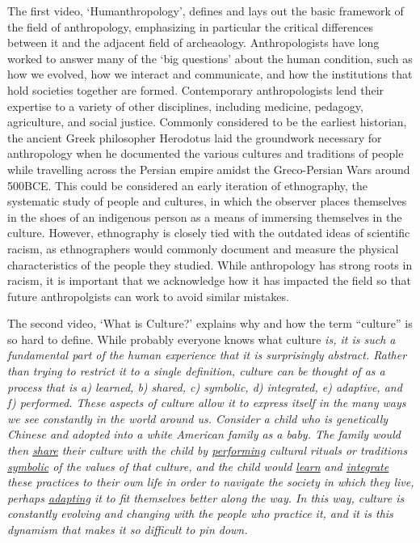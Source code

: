 \documentclass{article}
\begin{document}
The first video, `Humanthropology', defines and lays out the basic framework of the field of anthropology, emphasizing in particular the critical differences between it and the adjacent field of archeaology.
Anthropologists have long worked to answer many of the `big questions' about the human condition, such as how we evolved, how we interact and communicate, and how the institutions that hold societies together are formed.
Contemporary anthropologists lend their expertise to a variety of other disciplines, including medicine, pedagogy, agriculture, and social justice.
Commonly considered to be the earliest historian, the ancient Greek philosopher Herodotus laid the groundwork necessary for anthropology when he documented the various cultures and traditions of people while travelling across the Persian empire amidst the Greco-Persian Wars around 500BCE.
This could be considered an early iteration of ethnography, the systematic study of people and cultures, in which the observer places themselves in the shoes of an indigenous person as a means of immersing themselves in the culture.
However, ethnography is closely tied with the outdated ideas of scientific racism, as ethnographers would commonly document and measure the physical characteristics of the people they studied.
While anthropology has strong roots in racism, it is important that we acknowledge how it has impacted the field so that future anthropolgists can work to avoid similar mistakes.

The second video, `What is Culture?' explains why and how the term ``culture'' is so hard to define.
While probably everyone knows what culture \it{is}, it is such a fundamental part of the human experience that it is surprisingly abstract.
Rather than trying to restrict it to a single definition, culture can be thought of as a process that is
a) learned, b) shared, c) symbolic, d) integrated, e) adaptive, and f) performed.
These aspects of culture allow it to express itself in the many ways we see constantly in the world around us.
Consider a child who is genetically Chinese and adopted into a white American family as a baby.
The family would then \ul{share} their culture with the child by \ul{performing} cultural rituals or traditions \ul{symbolic} of the values of that culture, and the child would \ul{learn} and \ul{integrate} these practices to their own life in order to navigate the society in which they live, perhaps \ul{adapting} it to fit themselves better along the way.
In this way, culture is constantly evolving and changing with the people who practice it, and it is this dynamism that makes it so difficult to pin down.
\end{document}
